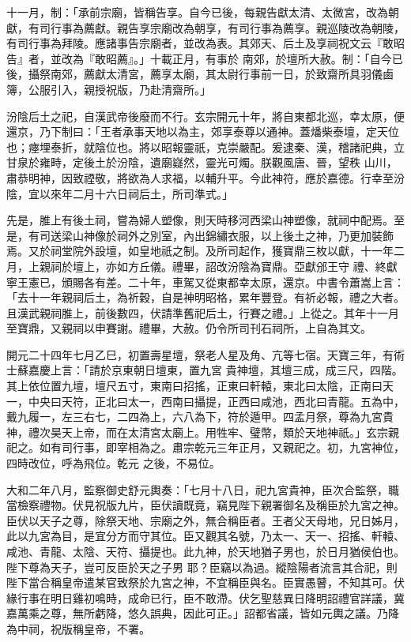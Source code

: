 \begin{pinyinscope}
 十一月，制：「承前宗廟，皆稱告享。自今已後，每親告獻太清、太微宮，改為朝獻，有司行事為薦獻。親告享宗廟改為朝享，有司行事為薦享。親巡陵改為朝陵，有司行事為拜陵。應諸事告宗廟者，並改為表。其郊天、后土及享祠祝文云『敢昭告』者，並改為『敢昭薦』。」十載正月，有事於
 南郊，於壇所大赦。制：「自今已後，攝祭南郊，薦獻太清宮，薦享太廟，其太尉行事前一日，於致齋所具羽儀鹵簿，公服引入，親授祝版，乃赴清齋所。」



 汾陰后土之祀，自漢武帝後廢而不行。玄宗開元十年，將自東都北巡，幸太原，便還京，乃下制曰：「王者承事天地以為主，郊享泰尊以通神。蓋燔柴泰壇，定天位也；瘞埋泰折，就陰位也。將以昭報靈祇，克崇嚴配。爰逮秦、漢，稽諸祀典，立甘泉於雍畤，定後土於汾陰，遺廟嶷然，靈光可燭。朕觀風唐、晉，望秩
 山川，肅恭明神，因致禋敬，將欲為人求福，以輔升平。今此神符，應於嘉德。行幸至汾陰，宜以來年二月十六日祠后土，所司準式。」



 先是，脽上有後土祠，嘗為婦人塑像，則天時移河西梁山神塑像，就祠中配焉。至是，有司送梁山神像於祠外之別室，內出錦繡衣服，以上後土之神，乃更加裝飾焉。又於祠堂院外設壇，如皇地祇之制。及所司起作，獲寶鼎三枚以獻，十一年二月，上親祠於壇上，亦如方丘儀。禮畢，詔改汾陰為寶鼎。亞獻邠王守
 禮、終獻寧王憲已，頒賜各有差。二十年，車駕又從東都幸太原，還京。中書令蕭嵩上言：「去十一年親祠后土，為祈穀，自是神明昭格，累年豐登。有祈必報，禮之大者。且漢武親祠脽上，前後數四，伏請準舊祀后土，行賽之禮。」上從之。其年十一月至寶鼎，又親祠以申賽謝。禮畢，大赦。仍令所司刊石祠所，上自為其文。



 開元二十四年七月乙巳，初置壽星壇，祭老人星及角、亢等七宿。天寶三年，有術士蘇嘉慶上言：「請於京東朝日壇東，置九宮
 貴神壇，其壇三成，成三尺，四階。其上依位置九壇，壇尺五寸，東南曰招搖，正東曰軒轅，東北曰太陰，正南曰天一，中央曰天符，正北曰太一，西南曰攝提，正西曰咸池，西北曰青龍。五為中，戴九履一，左三右七，二四為上，六八為下，符於遁甲。四孟月祭，尊為九宮貴神，禮次昊天上帝，而在太清宮太廟上。用牲牢、璧幣，類於天地神祇。」玄宗親祀之。如有司行事，即宰相為之。肅宗乾元三年正月，又親祀之。初，九宮神位，四時改位，呼為飛位。乾元
 之後，不易位。



 大和二年八月，監察御史舒元輿奏：「七月十八日，祀九宮貴神，臣次合監祭，職當檢察禮物。伏見祝版九片，臣伏讀既竟，竊見陛下親署御名及稱臣於九宮之神。臣伏以天子之尊，除祭天地、宗廟之外，無合稱臣者。王者父天母地，兄日姊月，此以九宮為目，是宜分方而守其位。臣又觀其名號，乃太一、天一、招搖、軒轅、咸池、青龍、太陰、天符、攝提也。此九神，於天地猶子男也，於日月猶侯伯也。陛下尊為天子，豈可反臣於天之子男
 耶？臣竊以為過。縱陰陽者流言其合祀，則陛下當合稱皇帝遣某官致祭於九宮之神，不宜稱臣與名。臣實愚瞽，不知其可。伏緣行事在明日雞初鳴時，成命已行，臣不敢滯。伏乞聖慈異日降明詔禮官詳議，冀嘉萬乘之尊，無所虧降，悠久誤典，因此可正。」詔都省議，皆如元輿之議。乃降為中祠，祝版稱皇帝，不署。




\end{pinyinscope}
